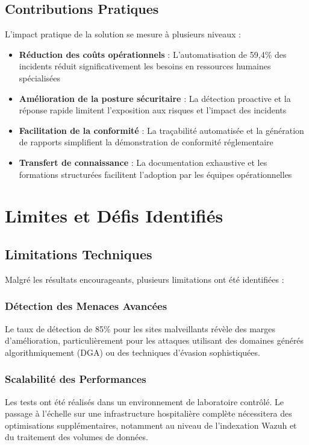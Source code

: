 \subsection{Contributions Pratiques}

L'impact pratique de la solution se mesure à plusieurs niveaux :

\begin{itemize}
    \item \textbf{Réduction des coûts opérationnels} : L'automatisation de 59,4\% des incidents réduit significativement les besoins en ressources humaines spécialisées
    \item \textbf{Amélioration de la posture sécuritaire} : La détection proactive et la réponse rapide limitent l'exposition aux risques et l'impact des incidents
    \item \textbf{Facilitation de la conformité} : La traçabilité automatisée et la génération de rapports simplifient la démonstration de conformité réglementaire
    \item \textbf{Transfert de connaissance} : La documentation exhaustive et les formations structurées facilitent l'adoption par les équipes opérationnelles
\end{itemize}

\section{Limites et Défis Identifiés}

\subsection{Limitations Techniques}

Malgré les résultats encourageants, plusieurs limitations ont été identifiées :

\subsubsection{Détection des Menaces Avancées}
Le taux de détection de 85\% pour les sites malveillants révèle des marges d'amélioration, particulièrement pour les attaques utilisant des domaines générés algorithmiquement (DGA) ou des techniques d'évasion sophistiquées.

\subsubsection{Scalabilité des Performances}
Les tests ont été réalisés dans un environnement de laboratoire contrôlé. Le passage à l'échelle sur une infrastructure hospitalière complète nécessitera des optimisations supplémentaires, notamment au niveau de l'indexation Wazuh et du traitement des volumes de données.

